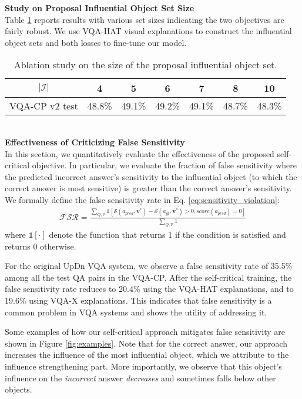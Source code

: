 \documentclass{article}
\begin{document}
\noindent\textbf{Study on Proposal Influential Object Set Size}\\
Table \ref{tab:ablation_study} reports results with various set sizes indicating the two objectives are fairly robust. We use VQA-HAT visual explanations to construct the influential object sets and both losses to fine-tune our model. 
\begin{table}[h]
\centering
\begin{tabular}{c|c|c|c|c|c|c}
\hline \toprule
$|\mathcal{I}|$ & 4   & 5   &  6    & 7  & 8  & 10  \\  \hline
VQA-CP v2 test  & 48.8\% & 49.1\% & 49.2\% & 49.1\% & 48.7\% & 48.3\%  \\ \bottomrule
\end{tabular}
\caption{Ablation study on the size of the proposal influential object set.}
\label{tab:ablation_study}
\end{table}\\
\noindent\textbf{Effectiveness of Criticizing False Sensitivity}\\
\label{sec:fsr}
In this section, we quantitatively evaluate the effectiveness of the proposed self-critical objective. In particular, we evaluate the fraction of false sensitivity where the predicted incorrect answer's sensitivity to the influential object (to which the correct answer is most sensitive) is greater than the correct answer's sensitivity. We formally define the false sensitivity rate in Eq. \ref{eq:sensitivity_violation}:
\begin{align}
    \mathcal{FSR} = \frac{\sum_{Q,\mathcal{V}} \mathds{1}[\mathcal{S}(a_{pred}, \textbf{v}^*) - \mathcal{S}(a_{gt}, \textbf{v}^*) > 0, score(a_{pred}) = 0]}{\sum_{Q,\mathcal{V}}1} \label{eq:sensitivity_violation}
\end{align}
where $\mathds{1}[\cdot]$ denote the function that returns 1 if the condition is satisfied and returns 0 otherwise. 


For the original UpDn VQA system, we observe a false sensitivity rate of 35.5\% among all the test QA pairs in the VQA-CP. After the self-critical training, the false sensitivity rate reduces to 20.4\% using the VQA-HAT  explanations, and to 19.6\% using VQA-X explanations. This indicates that false sensitivity is a common problem in VQA systems and shows the utility of addressing it.

Some examples of how our self-critical approach mitigates false sensitivity are shown in Figure \ref{fig:examples}. Note that for the correct answer, our approach increases the influence of the most influential object, which we attribute to the influence strengthening part. More importantly, we observe that this object's influence on the {\it incorrect} answer {\it decreases} and sometimes falls below other objects.
\end{document}
